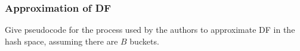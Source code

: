 \medskip
\begin{answer_box}[title=,height=3cm,width=16.5cm]  
    
\end{answer_box}

\subsubsection{Approximation of DF }

Give pseudocode for the process used by the authors to approximate DF in the hash space, assuming there are $B$ buckets.
\begin{answer_box}[title=,height=3cm,width=16.5cm]  
    
\end{answer_box}

 

 

 

 
